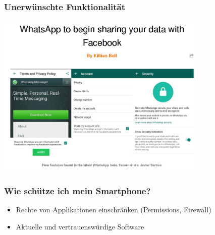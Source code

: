 \documentclass[12pt, xcolor={svgnames,table}]{beamer}
\begin{document}
\begin{frame}
  \frametitle{Unerwünschte Funktionalität}
  \begin{center}
    \includegraphics[width=10cm]{img/facebook_whatsapp.png}
  \par\end{center}
\end{frame}

\begin{frame}
    \frametitle{Wie schütze ich mein Smartphone?}
    \begin{itemize}
      \item Rechte von Applikationen einschränken (Permissions, Firewall)
      \item Aktuelle und vertrauenswürdige Software
    \end{itemize}
\end{frame}
\end{document}
